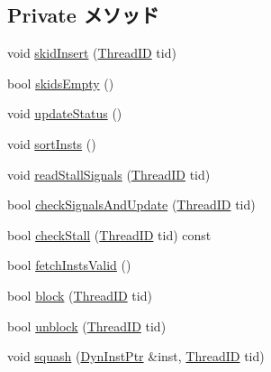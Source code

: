 \subsection*{Private メソッド}
\begin{DoxyCompactItemize}
\item 
void \hyperlink{classDefaultDecode_ac24515147270ef9b85991bbe13bd47af}{skidInsert} (\hyperlink{base_2types_8hh_ab39b1a4f9dad884694c7a74ed69e6a6b}{ThreadID} tid)
\item 
bool \hyperlink{classDefaultDecode_afe3e2673d17dd5c568862ef5ae68b4d8}{skidsEmpty} ()
\item 
void \hyperlink{classDefaultDecode_a4bb9486757ce225941aaaf759b357a57}{updateStatus} ()
\item 
void \hyperlink{classDefaultDecode_a9ff2aa32ab0f40674cb3518108d62f8e}{sortInsts} ()
\item 
void \hyperlink{classDefaultDecode_ad65c9f053a6038ac8c34c34bfe9a88c3}{readStallSignals} (\hyperlink{base_2types_8hh_ab39b1a4f9dad884694c7a74ed69e6a6b}{ThreadID} tid)
\item 
bool \hyperlink{classDefaultDecode_af77f2bf38a75182c65e633b9fdf295d2}{checkSignalsAndUpdate} (\hyperlink{base_2types_8hh_ab39b1a4f9dad884694c7a74ed69e6a6b}{ThreadID} tid)
\item 
bool \hyperlink{classDefaultDecode_a6ba4f2f95d991f5be818dabf7500feed}{checkStall} (\hyperlink{base_2types_8hh_ab39b1a4f9dad884694c7a74ed69e6a6b}{ThreadID} tid) const 
\item 
bool \hyperlink{classDefaultDecode_a5517058b9f07975a25ecbf123bcc4844}{fetchInstsValid} ()
\item 
bool \hyperlink{classDefaultDecode_ad1993925abd15d3fb59fde2ccfa3d678}{block} (\hyperlink{base_2types_8hh_ab39b1a4f9dad884694c7a74ed69e6a6b}{ThreadID} tid)
\item 
bool \hyperlink{classDefaultDecode_a9cc3b95f6969935f78c0158aa5145021}{unblock} (\hyperlink{base_2types_8hh_ab39b1a4f9dad884694c7a74ed69e6a6b}{ThreadID} tid)
\item 
void \hyperlink{classDefaultDecode_a80c82399ba102a2f35e863ee05d2e9dd}{squash} (\hyperlink{classDefaultDecode_a028ce10889c5f6450239d9e9a7347976}{DynInstPtr} \&inst, \hyperlink{base_2types_8hh_ab39b1a4f9dad884694c7a74ed69e6a6b}{ThreadID} tid)
\end{DoxyCompactItemize}
